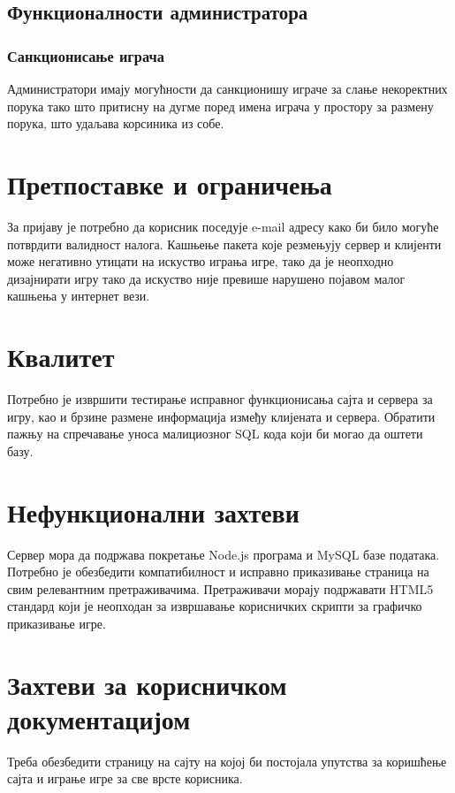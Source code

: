 \subsection{Функционалности администратора}

\subsubsection{Санкционисање играча}
Администратори имају могућности да санкционишу играче за слање некоректних порука тако што притисну на дугме поред
имена играча у простору за размену порука, што удаљава корсиника из собе.



\section{Претпоставке и ограничења}
За пријаву је потребно да корисник поседује e-mail адресу како би било могуће потврдити валидност налога.
Кашњење пакета које резмењују сервер и клијенти може негативно утицати на искуство играња игре, тако да је
неопходно дизајнирати игру тако да искуство није превише нарушено појавом малог кашњења у интернет вези.



\section{Квалитет}
Потребно је извршити тестирање исправног функционисања сајта и сервера за игру, као и брзине размене информација
између клијената и сервера. Обратити пажњу на спречавање уноса малициозног SQL кода који би могао да оштети базу.



\section{Нефункционални захтеви}
Сервер мора да подржава покретање Node.js програма и MySQL базе података. Потребно је обезбедити компатибилност 
и исправно приказивање страница на свим релевантним претраживачима. Претраживачи морају подржавати HTML5 стандард
који је неопходан за извршавање корисничких скрипти за графичко приказивање игре.



\section{Захтеви за корисничком документацијом}
Треба обезбедити страницу на сајту на којој би постојала упутства за коришћење сајта и играње игре за све врсте
корисника.



